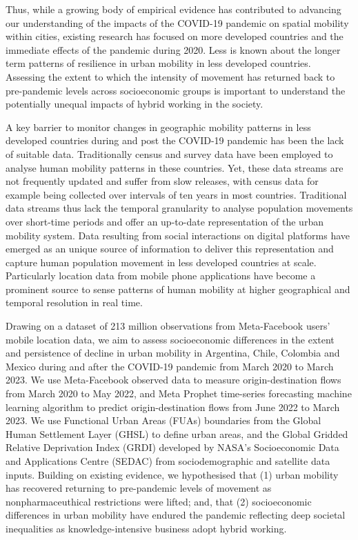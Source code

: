 \documentclass[
  11pt,
]{article}
\begin{document}
Thus, while a growing body of empirical evidence has contributed to
advancing our understanding of the impacts of the COVID-19 pandemic on
spatial mobility within cities, existing research has focused on more
developed countries and the immediate effects of the pandemic during
2020. Less is known about the longer term patterns of resilience in
urban mobility in less developed countries. Assessing the extent to
which the intensity of movement has returned back to pre-pandemic levels
across socioeconomic groups is important to understand the potentially
unequal impacts of hybrid working in the society.

A key barrier to monitor changes in geographic mobility patterns in less
developed countries during and post the COVID-19 pandemic has been the
lack of suitable data. Traditionally census and survey data have been
employed to analyse human mobility patterns in these countries. Yet,
these data streams are not frequently updated and suffer from slow
releases, with census data for example being collected over intervals of
ten years in most countries. Traditional data streams thus lack the
temporal granularity to analyse population movements over short-time
periods and offer an up-to-date representation of the urban mobility
system. Data resulting from social interactions on digital platforms
have emerged as an unique source of information to deliver this
representation and capture human population movement in less developed
countries at scale. Particularly location data from mobile phone
applications have become a prominent source to sense patterns of human
mobility at higher geographical and temporal resolution in real time.

Drawing on a dataset of 213 million observations from Meta-Facebook
users' mobile location data, we aim to assess socioeconomic differences
in the extent and persistence of decline in urban mobility in Argentina,
Chile, Colombia and Mexico during and after the COVID-19 pandemic from
March 2020 to March 2023. We use Meta-Facebook observed data to measure
origin-destination flows from March 2020 to May 2022, and Meta Prophet
time-series forecasting machine learning algorithm to predict
origin-destination flows from June 2022 to March 2023. We use Functional
Urban Areas (FUAs) boundaries from the Global Human Settlement Layer
(GHSL) to define urban areas, and the Global Gridded Relative
Deprivation Index (GRDI) developed by NASA's Socioeconomic Data and
Applications Centre (SEDAC) from sociodemographic and satellite data
inputs. Building on existing evidence, we hypothesised that (1) urban
mobility has recovered returning to pre-pandemic levels of movement as
nonpharmaceuthical restrictions were lifted; and, that (2) socioeconomic
differences in urban mobility have endured the pandemic reflecting deep
societal inequalities as knowledge-intensive business adopt hybrid
working.
\end{document}
